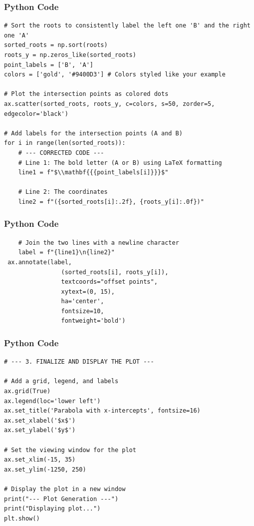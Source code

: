\documentclass{beamer}
\begin{document}
\begin{frame}[fragile]
\frametitle{Python Code}
\begin{lstlisting}
# Sort the roots to consistently label the left one 'B' and the right one 'A'
sorted_roots = np.sort(roots)
roots_y = np.zeros_like(sorted_roots)
point_labels = ['B', 'A']
colors = ['gold', '#9400D3'] # Colors styled like your example

# Plot the intersection points as colored dots
ax.scatter(sorted_roots, roots_y, c=colors, s=50, zorder=5, edgecolor='black')

# Add labels for the intersection points (A and B)
for i in range(len(sorted_roots)):
    # --- CORRECTED CODE ---
    # Line 1: The bold letter (A or B) using LaTeX formatting
    line1 = f"$\\mathbf{{{point_labels[i]}}}$"
    
    # Line 2: The coordinates
    line2 = f"({sorted_roots[i]:.2f}, {roots_y[i]:.0f})"
 \end{lstlisting}
\end{frame}
\begin{frame}[fragile]
\frametitle{Python Code}
\begin{lstlisting}   
    # Join the two lines with a newline character
    label = f"{line1}\n{line2}"
 ax.annotate(label,
                (sorted_roots[i], roots_y[i]),
                textcoords="offset points",
                xytext=(0, 15),
                ha='center',
                fontsize=10,
                fontweight='bold')
                \end{lstlisting}
\end{frame}
\begin{frame}[fragile]
\frametitle{Python Code}
\begin{lstlisting}
# --- 3. FINALIZE AND DISPLAY THE PLOT ---

# Add a grid, legend, and labels
ax.grid(True)
ax.legend(loc='lower left')
ax.set_title('Parabola with x-intercepts', fontsize=16)
ax.set_xlabel('$x$')
ax.set_ylabel('$y$')

# Set the viewing window for the plot
ax.set_xlim(-15, 35)
ax.set_ylim(-1250, 250)

# Display the plot in a new window
print("--- Plot Generation ---")
print("Displaying plot...")
plt.show()
\end{lstlisting}
\end{frame}
\end{document}
